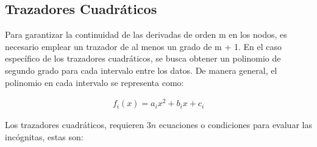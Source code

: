 \documentclass[conference]{IEEEtran}
\begin{document}
\subsection{Trazadores Cuadráticos}

Para garantizar la continuidad de las derivadas de orden m en los nodos,
es necesario emplear un trazador de al menos un grado de m + 1. En el
caso específico de los trazadores cuadráticos, se busca obtener un
polinomio de segundo grado para cada intervalo entre los datos. De manera
general, el polinomio en cada intervalo se representa como:

\begin{align}
	f_{i}(x) = a_{i}{x}^{2} + b_{i}x + c_{i}
	\label{eq:cuadratic_equation}
\end{align}

Los trazadores cuadráticos, requieren $3n$ ecuaciones o condiciones
para evaluar las incógnitas, estas son:
\end{document}

